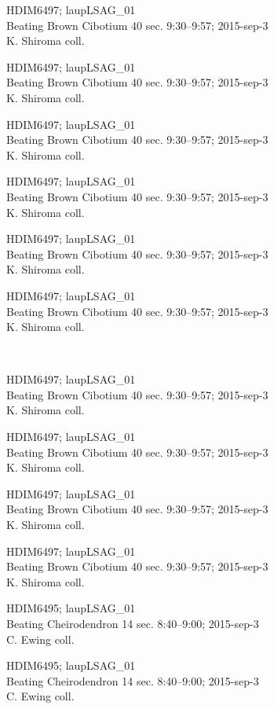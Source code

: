 \documentclass[2pt]{extarticle}
\begin{document}
\noindent
\parbox{0.16\textwidth}{\tiny \raggedright \rule[-0.3\baselineskip]{0pt}{10pt}HDIM6497; laupLSAG\_01\\ Beating Brown Cibotium 40 sec. 9:30--9:57; 2015-sep-3\\ K. Shiroma coll.}
\parbox{0.16\textwidth}{\tiny \raggedright \rule[-0.3\baselineskip]{0pt}{10pt}HDIM6497; laupLSAG\_01\\ Beating Brown Cibotium 40 sec. 9:30--9:57; 2015-sep-3\\ K. Shiroma coll.}
\parbox{0.16\textwidth}{\tiny \raggedright \rule[-0.3\baselineskip]{0pt}{10pt}HDIM6497; laupLSAG\_01\\ Beating Brown Cibotium 40 sec. 9:30--9:57; 2015-sep-3\\ K. Shiroma coll.}
\parbox{0.16\textwidth}{\tiny \raggedright \rule[-0.3\baselineskip]{0pt}{10pt}HDIM6497; laupLSAG\_01\\ Beating Brown Cibotium 40 sec. 9:30--9:57; 2015-sep-3\\ K. Shiroma coll.}
\parbox{0.16\textwidth}{\tiny \raggedright \rule[-0.3\baselineskip]{0pt}{10pt}HDIM6497; laupLSAG\_01\\ Beating Brown Cibotium 40 sec. 9:30--9:57; 2015-sep-3\\ K. Shiroma coll.}
\parbox{0.16\textwidth}{\tiny \raggedright \rule[-0.3\baselineskip]{0pt}{10pt}HDIM6497; laupLSAG\_01\\ Beating Brown Cibotium 40 sec. 9:30--9:57; 2015-sep-3\\ K. Shiroma coll.} \\ 
\vspace{0.001in} 

\noindent
\parbox{0.16\textwidth}{\tiny \raggedright \rule[-0.3\baselineskip]{0pt}{10pt}HDIM6497; laupLSAG\_01\\ Beating Brown Cibotium 40 sec. 9:30--9:57; 2015-sep-3\\ K. Shiroma coll.}
\parbox{0.16\textwidth}{\tiny \raggedright \rule[-0.3\baselineskip]{0pt}{10pt}HDIM6497; laupLSAG\_01\\ Beating Brown Cibotium 40 sec. 9:30--9:57; 2015-sep-3\\ K. Shiroma coll.}
\parbox{0.16\textwidth}{\tiny \raggedright \rule[-0.3\baselineskip]{0pt}{10pt}HDIM6497; laupLSAG\_01\\ Beating Brown Cibotium 40 sec. 9:30--9:57; 2015-sep-3\\ K. Shiroma coll.}
\parbox{0.16\textwidth}{\tiny \raggedright \rule[-0.3\baselineskip]{0pt}{10pt}HDIM6497; laupLSAG\_01\\ Beating Brown Cibotium 40 sec. 9:30--9:57; 2015-sep-3\\ K. Shiroma coll.}
\parbox{0.16\textwidth}{\tiny \raggedright \rule[-0.3\baselineskip]{0pt}{10pt}HDIM6495; laupLSAG\_01\\ Beating Cheirodendron 14 sec. 8:40--9:00; 2015-sep-3\\ C. Ewing coll.}
\parbox{0.16\textwidth}{\tiny \raggedright \rule[-0.3\baselineskip]{0pt}{10pt}HDIM6495; laupLSAG\_01\\ Beating Cheirodendron 14 sec. 8:40--9:00; 2015-sep-3\\ C. Ewing coll.} \\ 
\vspace{0.001in} 
\end{document}
